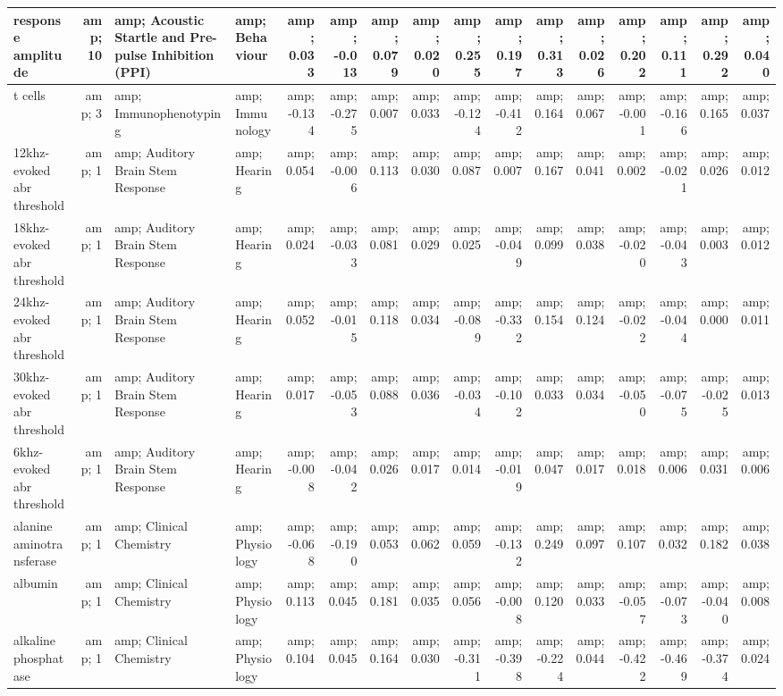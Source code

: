 \documentclass[]{article}
\begin{document}
\begin{table}
\begin{tabular}[t]{l|r|l|l|r|r|r|r|r|r|r|r|r|r|r|r}
\hline
response amplitude &amp; 10 &amp; Acoustic Startle and Pre-pulse Inhibition (PPI) &amp; Behaviour &amp; 0.033 &amp; -0.013 &amp; 0.079 &amp; 0.020 &amp; 0.255 &amp; 0.197 &amp; 0.313 &amp; 0.026 &amp; 0.202 &amp; 0.111 &amp; 0.292 &amp; 0.040\\
\hline
t cells &amp; 3 &amp; Immunophenotyping &amp; Immunology &amp; -0.134 &amp; -0.275 &amp; 0.007 &amp; 0.033 &amp; -0.124 &amp; -0.412 &amp; 0.164 &amp; 0.067 &amp; -0.001 &amp; -0.166 &amp; 0.165 &amp; 0.037\\
\hline
12khz-evoked abr threshold &amp; 1 &amp; Auditory Brain Stem Response &amp; Hearing &amp; 0.054 &amp; -0.006 &amp; 0.113 &amp; 0.030 &amp; 0.087 &amp; 0.007 &amp; 0.167 &amp; 0.041 &amp; 0.002 &amp; -0.021 &amp; 0.026 &amp; 0.012\\
\hline
18khz-evoked abr threshold &amp; 1 &amp; Auditory Brain Stem Response &amp; Hearing &amp; 0.024 &amp; -0.033 &amp; 0.081 &amp; 0.029 &amp; 0.025 &amp; -0.049 &amp; 0.099 &amp; 0.038 &amp; -0.020 &amp; -0.043 &amp; 0.003 &amp; 0.012\\
\hline
24khz-evoked abr threshold &amp; 1 &amp; Auditory Brain Stem Response &amp; Hearing &amp; 0.052 &amp; -0.015 &amp; 0.118 &amp; 0.034 &amp; -0.089 &amp; -0.332 &amp; 0.154 &amp; 0.124 &amp; -0.022 &amp; -0.044 &amp; 0.000 &amp; 0.011\\
\hline
30khz-evoked abr threshold &amp; 1 &amp; Auditory Brain Stem Response &amp; Hearing &amp; 0.017 &amp; -0.053 &amp; 0.088 &amp; 0.036 &amp; -0.034 &amp; -0.102 &amp; 0.033 &amp; 0.034 &amp; -0.050 &amp; -0.075 &amp; -0.025 &amp; 0.013\\
\hline
6khz-evoked abr threshold &amp; 1 &amp; Auditory Brain Stem Response &amp; Hearing &amp; -0.008 &amp; -0.042 &amp; 0.026 &amp; 0.017 &amp; 0.014 &amp; -0.019 &amp; 0.047 &amp; 0.017 &amp; 0.018 &amp; 0.006 &amp; 0.031 &amp; 0.006\\
\hline
alanine aminotransferase &amp; 1 &amp; Clinical Chemistry &amp; Physiology &amp; -0.068 &amp; -0.190 &amp; 0.053 &amp; 0.062 &amp; 0.059 &amp; -0.132 &amp; 0.249 &amp; 0.097 &amp; 0.107 &amp; 0.032 &amp; 0.182 &amp; 0.038\\
\hline
albumin &amp; 1 &amp; Clinical Chemistry &amp; Physiology &amp; 0.113 &amp; 0.045 &amp; 0.181 &amp; 0.035 &amp; 0.056 &amp; -0.008 &amp; 0.120 &amp; 0.033 &amp; -0.057 &amp; -0.073 &amp; -0.040 &amp; 0.008\\
\hline
alkaline phosphatase &amp; 1 &amp; Clinical Chemistry &amp; Physiology &amp; 0.104 &amp; 0.045 &amp; 0.164 &amp; 0.030 &amp; -0.311 &amp; -0.398 &amp; -0.224 &amp; 0.044 &amp; -0.422 &amp; -0.469 &amp; -0.374 &amp; 0.024\\

\end{tabular}
\end{table}
\end{document}

